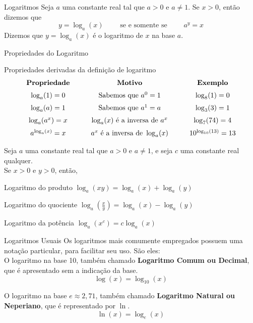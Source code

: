 \begin{teoria}{Logaritmos}
    Seja $a$ uma constante real tal que $a > 0$ e $a\neq 1$. Se $x > 0$, então dizemos que
    \[ y = \log_a(x) \qquad \text{ se e somente se } \qquad a^y = x \]
    Dizemos que $y = \log_a(x)$ é o logaritmo de $x$ na base $a$.
\end{teoria}

\begin{teoria}{Propriedades do Logaritmo}
    
    Propriedades derivadas da definição de logaritmo
    \[
    \begin{array}{ccc}
    	\textbf{Propriedade} &                        \textbf{Motivo}                        &    \textbf{Exemplo}     \\[2mm]
    	   \log_a(1) = 0     &                  \text{Sabemos que } a^0 = 1                  &      \log_8(1) = 0      \\[2mm]
    	   \log_a(a) = 1     &                  \text{Sabemos que } a^1 = a                  &      \log_3(3) = 1      \\[2mm]
    	  \log_a(a^x) = x    &             \log_a(x) \text{ é a inversa de } a^x             &    \log_7(7 4 ) = 4     \\[2mm]
    	 a^{\log_a(x)} = x   & \null\qquad a^x \text{ é a inversa de } \log_a(x) \qquad\null & 10^{\log_{10}(13)} = 13
    \end{array}
    \]
    
    Seja $a$ uma constante real tal que $a > 0$ e $a\neq 1$, e seja $c$ uma constante real qualquer. \\
    Se $x > 0$ e $y > 0$, então,
    \begin{propriedades}
        \item Logaritmo do produto   \tabto{5cm}  $\displaystyle \log_a(xy) = \log_a(x) + \log_a(y) $
        \item Logaritmo do quociente \tabto{5cm}  $\displaystyle \log_a\left(\frac{x}{y}\right) = \log_a(x) - \log_a(y) $
        \item Logaritmo da potência  \tabto{5cm}  $\displaystyle \log_a(x^c) = c\log_a(x) $
    \end{propriedades}
\end{teoria}

\begin{teoria}{Logaritmos Usuais}
    Os logaritmos mais comumente empregados possuem uma notação particular, para facilitar seu uso. São eles:
    \\
    
    O logaritmo na base 10, também chamado \textbf{Logaritmo Comum ou Decimal}, que é apresentado sem a indicação da base.
    \[\log(x) = \log_{10}(x) \]
        
    O logaritmo na base $e\approx 2,71$, também chamado \textbf{Logaritmo Natural ou Neperiano}, que é representado por $\ln$.
    \[\ln(x) = \log_e(x)\]

\end{teoria}

